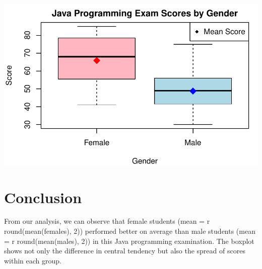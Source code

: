 \documentclass[
  letterpaper,
  DIV=11,
  numbers=noendperiod]{scrartcl}
\begin{document}
\includegraphics{Exercises1-1_files/figure-pdf/unnamed-chunk-6-1.pdf}

\section{Conclusion}\label{conclusion}

From our analysis, we can observe that female students (mean = r
round(mean(females), 2)) performed better on average than male students
(mean = r round(mean(males), 2)) in this Java programming examination.
The boxplot shows not only the difference in central tendency but also
the spread of scores within each group.
\end{document}
